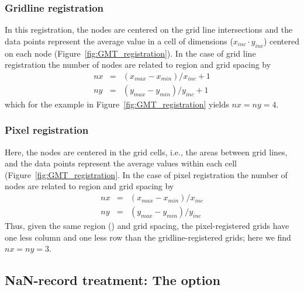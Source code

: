 \subsubsection{Gridline registration}

In this registration, the nodes are centered on the grid line
intersections and the data points represent the average value
in a cell of dimensions ($x_{inc} \cdot y_{inc}$) centered on each
node (Figure~\ref{fig:GMT_registration}).
In the case of grid line registration the number of nodes are
related to region and grid spacing by \\

\[ \begin{array}{ccl} 
nx & =  &       (x_{max} - x_{min}) / x_{inc} + 1       \\ 
ny & =  &       (y_{max} - y_{min}) / y_{inc} + 1
\end{array} \]
which for the example in Figure~\ref{fig:GMT_registration} yields $nx = ny = 4$.



\subsubsection{Pixel registration}

Here, the nodes are centered in the grid cells, i.e., the areas
between grid lines, and the data points represent the average
values within each cell (Figure~\ref{fig:GMT_registration}.
In the case of pixel registration the number of nodes are related
to region and grid spacing by \\

\[ \begin{array}{ccl} 
nx & =  &       (x_{max} - x_{min}) / x_{inc}   \\ 
ny & =  &       (y_{max} - y_{min}) / y_{inc}
\end{array} \]
Thus, given the same region () and grid spacing, the pixel-registered grids have one less
column and one less row than the gridline-registered grids; here we
find $nx = ny = 3$.


\subsection{NaN-record treatment: The  option}

